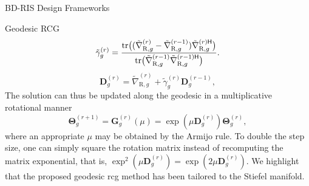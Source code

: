 \begin{section}{BD-RIS Design Frameworks}
\begin{subsection}{Geodesic RCG}
	\begin{equation}
		\tilde{\gamma}_g^{(r)} = \frac{\tr\bigl((\tilde{\nabla}_{\mathrm{R},g}^{(r)} - \tilde{\nabla}_{\mathrm{R},g}^{(r-1)}) {\tilde{\nabla}_{\mathrm{R},g}^{(r)\mathsf{H}}}\bigr)}{\tr\bigl(\tilde{\nabla}_{\mathrm{R},g}^{(r-1)} {\tilde{\nabla}_{\mathrm{R},g}^{(r-1)\mathsf{H}}}\bigr)}. %
		\label{eq:parameter_cg_geodesic}
	\end{equation}
	\begin{equation}
		{\mathbf{D}}_g^{(r)} = \tilde{\nabla}_{\mathrm{R},g}^{(r)} + \tilde{\gamma}_g^{(r)} {\mathbf{D}}_g^{(r-1)},
		\label{eq:direction_cg_geodesic}
	\end{equation}
	The solution can thus be updated along the geodesic in a multiplicative rotational manner
	\begin{equation}
		\mathbf{\Theta}_g^{(r+1)} = \mathbf{G}_g^{(r)}(\mu) = \exp(\mu \mathbf{D}_g^{(r)}) \mathbf{\Theta}_g^{(r)},
		\label{eq:update_geodesic}
	\end{equation}
	where an appropriate $\mu$ may be obtained by the Armijo rule.
	To double the step size, one can simply square the rotation matrix instead of recomputing the matrix exponential, that is, $\exp^2(\mu \mathbf{D}_g^{(r)}) = \exp(2 \mu \mathbf{D}_g^{(r)})$.
	We highlight that the proposed geodesic \gls{rcg} method has been tailored to the Stiefel manifold.


\end{subsection}
\end{section}

